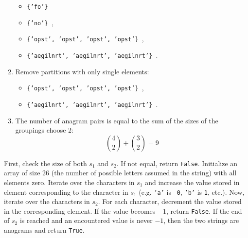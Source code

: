 \documentclass[12pt,twoside]{article}
\begin{document}
\begin{problems}
\begin{problemparts}
\begin{enumerate}
\begin{itemize}
            \item {\tt \{'fo'\} }
            \item {\tt \{'no'\} },
            \item {\tt \{'opst', 'opst', 'opst', 'opst'\} },
            \item {\tt \{'aegilnrt', 'aegilnrt', 'aegilnrt'\} }.
        \end{itemize}
    \item Remove partitions with only single elements:
        \begin{itemize}
            \item {\tt \{'opst', 'opst', 'opst', 'opst'\} },
            \item {\tt \{'aegilnrt', 'aegilnrt', 'aegilnrt'\} }.
        \end{itemize}
    \item The number of anagram pairs is equal to the sum of the sizes of the
    groupings choose 2:
    $$ \binom{4}{2} + \binom{3}{2} = 9 $$
\end{enumerate}
 First, check the size of both $s_1$ and $s_2$.
    If not equal, return {\tt False}. Initialize an array of size 26 (the
    number of possible letters assumed in the string) with all elements zero.
    Iterate over the characters in $s_1$ and increase the value stored in
    element corresponding to the character in $s_1$ (e.g. {\tt 'a'} is {\tt
    0}, {\tt 'b'} is {\tt 1}, etc.). Now, iterate over the characters in
    $s_2$. For each character, decrement the value stored in the
    corresponding element. If the value becomes $-1$, return {\tt False}. If
    the end of $s_2$ is reached and an encountered value is never $-1$, then
    the two strings are anagrams and return {\tt True}.


\end{problemparts}
\end{problems}
\end{document}
